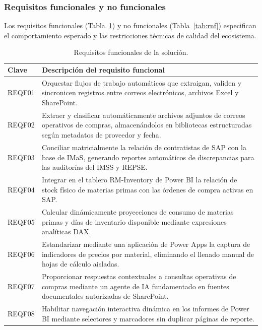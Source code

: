 \subsubsection{Requisitos funcionales y no funcionales}

Los requisitos funcionales (Tabla~\ref{tab:rf}) y no funcionales (Tabla~\ref{tab:rnf}) especifican el comportamiento esperado y las restricciones técnicas de calidad del ecosistema.

\begin{table}[H]
  \centering
  \caption{Requisitos funcionales de la solución.}
  \label{tab:rf}
  \begin{tabular}{@{}p{1.6cm}p{10.4cm}@{}}
    \toprule
    \textbf{Clave} & \textbf{Descripción del requisito funcional} \\
    \midrule
    REQF01 & Orquestar flujos de trabajo automáticos que extraigan, validen y sincronicen registros entre correos electrónicos, archivos Excel y SharePoint. \\
    REQF02 & Extraer y clasificar automáticamente archivos adjuntos de correos operativos de compras, almacenándolos en bibliotecas estructuradas según metadatos de proveedor y fecha. \\
    REQF03 & Conciliar matricialmente la relación de contratistas de SAP con la base de IMaS, generando reportes automáticos de discrepancias para las auditorías del IMSS y REPSE. \\
    REQF04 & Integrar en el tablero RM-Inventory de Power BI la relación de stock físico de materias primas con las órdenes de compra activas en SAP. \\
    REQF05 & Calcular dinámicamente proyecciones de consumo de materias primas y días de inventario disponible mediante expresiones analíticas DAX. \\
    REQF06 & Estandarizar mediante una aplicación de Power Apps la captura de indicadores de precios por material, eliminando el llenado manual de hojas de cálculo aisladas. \\
    REQF07 & Proporcionar respuestas contextuales a consultas operativas de compras mediante un agente de IA fundamentado en fuentes documentales autorizadas de SharePoint. \\
    REQF08 & Habilitar navegación interactiva dinámica en los informes de Power BI mediante selectores y marcadores sin duplicar páginas de reporte. \\
    \bottomrule
  \end{tabular}
\end{table}

